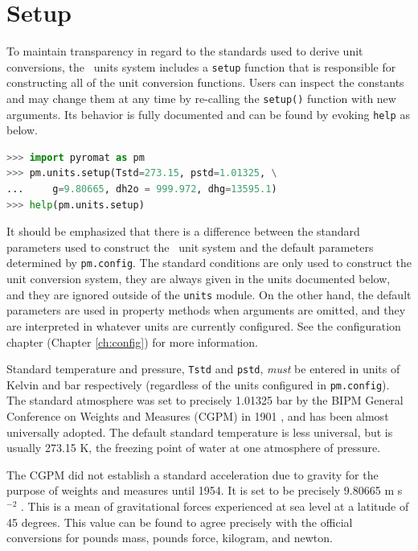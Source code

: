 \section{Setup}\label{sec:units:setup}

To maintain transparency in regard to the standards used to derive unit conversions, the \PM\ units system includes a \verb|setup| function that is responsible for constructing all of the unit conversion functions.  Users can inspect the constants and may change them at any time by re-calling the \texttt{setup()} function with new arguments.  Its behavior is fully documented and can be found by evoking \verb|help| as below.

\begin{lstlisting}[language=Python]
>>> import pyromat as pm
>>> pm.units.setup(Tstd=273.15, pstd=1.01325, \
...     g=9.80665, dh2o = 999.972, dhg=13595.1)
>>> help(pm.units.setup)
\end{lstlisting}

It should be emphasized that there is a difference between the standard parameters used to construct the \PM\ unit system and the default parameters determined by \verb|pm.config|.  The standard conditions are only used to construct the unit conversion system, they are always given in the units documented below, and they are ignored outside of the \verb|units| module.  On the other hand, the default parameters are used in property methods when arguments are omitted, and they are interpreted in whatever units are currently configured.  See the configuration chapter (Chapter \ref{ch:config}) for more information.

Standard temperature and pressure, \verb|Tstd| and \verb|pstd|, \emph{must} be entered in units of Kelvin and bar respectively (regardless of the units configured in \verb|pm.config|).  The standard atmosphere was set to precisely 1.01325 bar by the BIPM General Conference on Weights and Measures (CGPM) in 1901 \cite{cgpm:3:2}, and has been almost universally adopted.  The default standard temperature is less universal, but is usually 273.15 K, the freezing point of water at one atmosphere of pressure.

The CGPM did not establish a standard acceleration due to gravity for the purpose of weights and measures until 1954.  It is set to be precisely 9.80665 m s$^{-2}$ \cite{cgpm:10:4}.  This is a mean of gravitational forces experienced at sea level at a latitude of 45 degrees.  This value can be found to agree precisely with the official conversions for pounds mass, pounds force, kilogram, and newton. 

